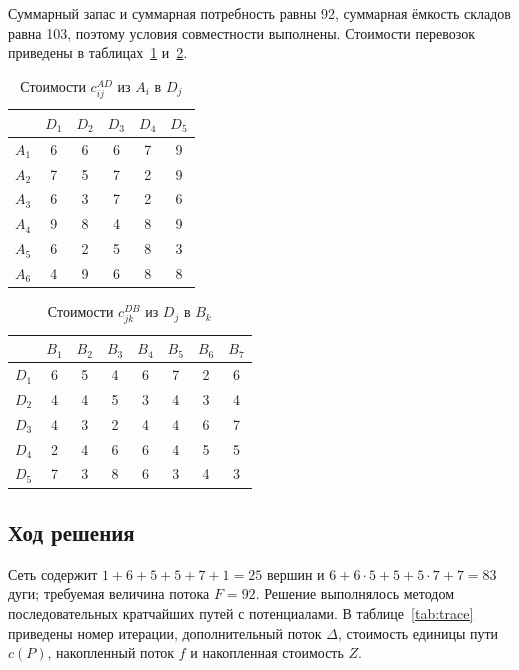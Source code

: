 Суммарный запас и суммарная потребность равны 92, суммарная ёмкость складов
равна 103, поэтому условия совместности выполнены. Стоимости перевозок
приведены в таблицах~\ref{tab:cad} и~\ref{tab:cdb}.

\begin{table}[h!]
\centering
\caption{Стоимости $c^{AD}_{ij}$ из $A_i$ в $D_j$}
\label{tab:cad}
\begin{tabular}{|c|c|c|c|c|c|}
\hline
 & $D_1$ & $D_2$ & $D_3$ & $D_4$ & $D_5$ \\
\hline
$A_1$ & 6 & 6 & 6 & 7 & 9 \\
\hline
$A_2$ & 7 & 5 & 7 & 2 & 9 \\
\hline
$A_3$ & 6 & 3 & 7 & 2 & 6 \\
\hline
$A_4$ & 9 & 8 & 4 & 8 & 9 \\
\hline
$A_5$ & 6 & 2 & 5 & 8 & 3 \\
\hline
$A_6$ & 4 & 9 & 6 & 8 & 8 \\
\hline
\end{tabular}
\end{table}

\begin{table}[h!]
\centering
\caption{Стоимости $c^{DB}_{jk}$ из $D_j$ в $B_k$}
\label{tab:cdb}
\small
\begin{tabular}{|c|c|c|c|c|c|c|c|}
\hline
 & $B_1$ & $B_2$ & $B_3$ & $B_4$ & $B_5$ & $B_6$ & $B_7$ \\
\hline
$D_1$ & 6 & 5 & 4 & 6 & 7 & 2 & 6 \\
\hline
$D_2$ & 4 & 4 & 5 & 3 & 4 & 3 & 4 \\
\hline
$D_3$ & 4 & 3 & 2 & 4 & 4 & 6 & 7 \\
\hline
$D_4$ & 2 & 4 & 6 & 6 & 4 & 5 & 5 \\
\hline
$D_5$ & 7 & 3 & 8 & 6 & 3 & 4 & 3 \\
\hline
\end{tabular}
\end{table}

\subsection*{Ход решения}

Сеть содержит $1+6+5+5+7+1=25$ вершин и
$6+6\cdot5+5+5\cdot7+7=83$ дуги; требуемая величина потока $F=92$.
Решение выполнялось методом последовательных кратчайших путей с
потенциалами. В таблице~\ref{tab:trace} приведены номер итерации,
дополнительный поток $\Delta$, стоимость единицы пути $c(P)$, накопленный
поток $f$ и накопленная стоимость $Z$.

